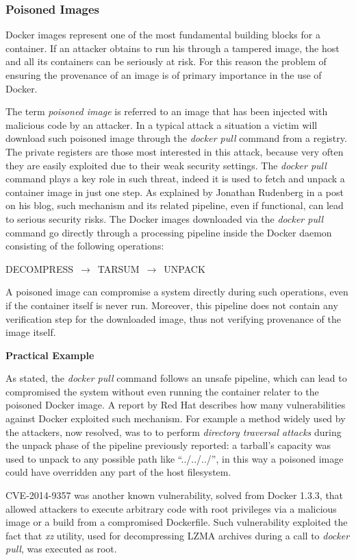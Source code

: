 \documentclass[a4paper,12pt]{article}
\begin{document}
\subsubsection{Poisoned Images}

Docker images represent one of the most fundamental building blocks for a
container. If an attacker obtains to run his through a tampered image, the host
and all its containers can be seriously at risk. For this reason the problem of
ensuring the provenance of an image is of primary importance in the use of
Docker. \par The term \textit{poisoned image} is referred to an image that has
been injected with malicious code by an attacker. In a typical attack a
situation a victim will download such poisoned image through the \textit{docker
pull} command from a registry. The private registers are those most interested
in this attack, because very often they are easily exploited due to their weak
security settings. The \textit{docker pull} command plays a key role in such
threat, indeed it is used to fetch and unpack a container image in just one
step. As explained by Jonathan Rudenberg in a post
\cite{docker_image_insecurity} on his blog, such mechanism and its related
pipeline, even if functional, can lead to serious security risks. The Docker
images downloaded via the \textit{docker pull} command go directly through a
processing pipeline inside the Docker daemon consisting of the following
operations: \bigbreak\centerline{DECOMPRESS $\,\to\,$ TARSUM $\,\to\,$
UNPACK}\bigbreak A poisoned image can compromise a system directly during such
operations, even if the container itself is never run. Moreover, this pipeline
does not contain any verification step for the downloaded image, thus not
verifying provenance of the image itself. 

\bigbreak\textbf{Practical Example}\bigbreak 

As stated, the \textit{docker pull} command follows an unsafe pipeline, which
can lead to compromised the system without even running the container relater to
the poisoned Docker image. A report by Red Hat \cite{docker_pull_red_hat}
describes how many vulnerabilities against Docker exploited such mechanism. For
example a method widely used by the attackers, now resolved, was to to perform
\textit{directory traversal attacks} during the unpack phase of the pipeline
previously reported: a tarball's capacity was used to unpack to any possible
path like ``../../../'', in this way a poisoned image could have overridden any
part of the host filesystem. \par CVE-2014-9357 \cite{CVE-2014-9357} was another
known vulnerability, solved from Docker 1.3.3, that allowed attackers to execute
arbitrary code with root privileges via a malicious image or a build from a
compromised Dockerfile. Such vulnerability exploited the fact that \textit{xz}
utility, used for decompressing LZMA archives during a call to \textit{docker
pull}, was executed as root. 
\end{document}
